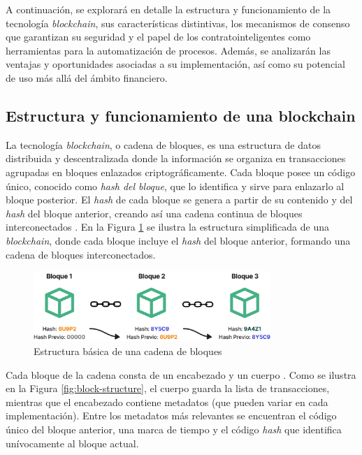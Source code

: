A continuación, se explorará en detalle la estructura y funcionamiento de la tecnología \textit{blockchain}, sus características distintivas, los mecanismos de consenso que garantizan su seguridad y el papel de los \glspl{contratointeligente} como herramientas para la automatización de procesos. Además, se analizarán las ventajas y oportunidades asociadas a su implementación, así como su potencial de uso más allá del ámbito financiero.

\subsection{Estructura y funcionamiento de una blockchain}

La tecnología \textit{\gls{blockchain}}, o cadena de bloques, es una estructura de datos distribuida y descentralizada donde la información se organiza en transacciones agrupadas en bloques enlazados criptográficamente. Cada bloque posee un código único, conocido como \textit{\gls{hash} del bloque}, que lo identifica y sirve para enlazarlo al bloque posterior. El \textit{hash} de cada bloque se genera a partir de su contenido y del \textit{hash} del bloque anterior, creando así una cadena continua de bloques interconectados \cite{tripathi2023comprehensive}. En la Figura \ref{fig:blockchain-basic} se ilustra la estructura simplificada de una \textit{blockchain}, donde cada bloque incluye el \textit{hash} del bloque anterior, formando una cadena de bloques interconectados.

\begin{figure}[!ht]
    \centering
    \includegraphics[width=0.8\textwidth]{Figures/blockchain-basic.png}
    \caption{Estructura básica de una cadena de bloques}
    \label{fig:blockchain-basic}
\end{figure}

Cada bloque de la cadena consta de un encabezado y un cuerpo \cite{tripathi2023comprehensive}. Como se ilustra en la Figura \ref{fig:block-structure}, el cuerpo guarda la lista de transacciones, mientras que el encabezado contiene metadatos (que pueden variar en cada implementación). Entre los metadatos más relevantes se encuentran el código único del bloque anterior, una marca de tiempo y el código \textit{hash} que identifica unívocamente al bloque actual.

